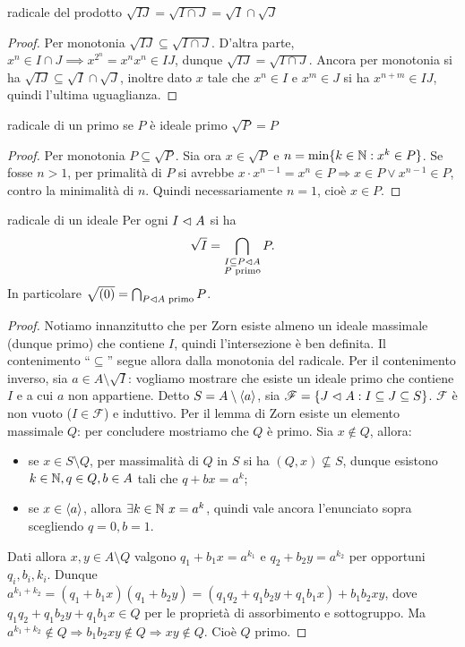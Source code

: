 \begin{proposition}{radicale del prodotto}
    $\sqrt{IJ} = \sqrt{I \cap J} = \sqrt{I} \cap \sqrt{J}$
\end{proposition}
\begin{proof}
    Per monotonia $\sqrt{IJ} \subseteq \sqrt{I \cap J}$. D'altra parte, $x^n \in I \cap J \implies x^{2^n} = x^n x^n \in IJ$, dunque $\sqrt{IJ} = \sqrt{I \cap J}$. Ancora per monotonia si ha $\sqrt{IJ} \subseteq \sqrt{I} \cap \sqrt{J}$, inoltre dato $x$ tale che $x^n \in I$ e $x^m \in J$ si ha $x^{n+m} \in IJ$, quindi l'ultima uguaglianza.
\end{proof}
\begin{proposition}{radicale di un primo}
    se $P$ è ideale primo $\sqrt{P} = P$
\end{proposition}
\begin{proof}
    Per monotonia $P \subseteq \sqrt{P}$. Sia ora $x \in \sqrt{P}$ e $n = \min\{k \in \mathbb{N} : x^k \in P \}$. Se fosse $n > 1$, per primalità di $P$ si avrebbe $x \cdot x^{n-1} = x^n \in P \Rightarrow x \in P \lor x^{n-1} \in P$, contro la minimalità di $n$. Quindi necessariamente $n = 1$, cioè $x \in P$.
\end{proof}
\begin{proposition}{radicale di un ideale}
    Per ogni $I \vartriangleleft A$ si ha
    \[
    \sqrt{I} = \bigcap_{\substack{I \subseteq P \vartriangleleft A \\ P \text{ primo}}} P.
    \]
    In particolare $\sqrt{(0)} = \bigcap_{P \vartriangleleft A \text{ primo}} P$.
\end{proposition}
\begin{proof}
    Notiamo innanzitutto che per Zorn esiste almeno un ideale massimale (dunque primo) che contiene $I$, quindi l'intersezione è ben definita.
    Il contenimento ``$\subseteq$'' segue allora dalla monotonia del radicale.
    Per il contenimento inverso, sia $a \in A \setminus \sqrt{I}$: vogliamo mostrare che esiste un ideale primo che contiene $I$ e a cui $a$ non appartiene. Detto $S = A \setminus \langle a \rangle$, sia $\mathscr{F} = \{J \vartriangleleft A : I \subseteq J \subseteq S\}$. $\mathscr{F}$ è non vuoto ($I \in \mathscr{F}$) e induttivo. Per il lemma di Zorn esiste un elemento massimale $Q$: per concludere mostriamo che $Q$ è primo. Sia $x \notin Q$, allora:
    \begin{itemize}
        \item se $x \in S \setminus Q$, per massimalità di $Q$ in $S$ si ha $(Q,x) \nsubseteq S$, dunque esistono $k \in \mathbb{N}, q \in Q, b \in A$ tali che $q + bx = a^k$;
        \item se $x \in \langle a \rangle$, allora $\exists k \in \mathbb{N} \ x = a^k$, quindi vale ancora l'enunciato sopra scegliendo $q = 0, b = 1$.
    \end{itemize}
     Dati allora $x,y \in A \setminus Q$ valgono $q_1 + b_1 x = a^{k_1}$ e $q_2 + b_2 y = a^{k_2}$ per opportuni $q_i, b_i, k_i$. Dunque $a^{k_1 + k_2} = (q_1 + b_1 x)(q_1 + b_2 y) = (q_1 q_2 + q_1 b_2 y + q_1 b_1 x) + b_1 b_2 x y$, dove $q_1 q_2 + q_1 b_2 y + q_1 b_1 x \in Q$ per le proprietà di assorbimento e sottogruppo. Ma $a^{k_1 + k_2} \notin Q \Rightarrow b_1 b_2 x y \notin Q \Rightarrow xy \notin Q$. Cioè $Q$ primo.
\end{proof}


